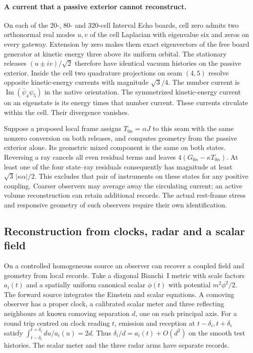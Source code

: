 \documentclass[11pt]{article}
\begin{document}
\paragraph{A current that a passive exterior cannot reconstruct.}
\label{par:ray-pair-native-current}
On each of the 20-, 80- and 320-cell Interval Echo boards, cell zero
admits two orthonormal real modes $u,v$ of the cell Laplacian with
eigenvalue six and zeros on every gateway. Extension by zero makes them
exact eigenvectors of the free board generator at kinetic energy three
above its uniform orbital. The stationary releases $(u\pm iv)/\sqrt2$
therefore have identical vacuum histories on the passive exterior.
Inside the cell two quadrature projections on seam $(4,5)$ resolve
opposite kinetic-energy currents with magnitude $\sqrt3/4$. The
number current is $\operatorname{Im}(\bar\psi_4\psi_5)$ in the native
orientation. The symmetrized kinetic-energy current on an eigenstate is
its energy times that number current. These currents circulate within
the cell. Their divergence vanishes.

Suppose a proposed local frame assigns $T_{0n}=\alpha J$ to this seam
with the same nonzero conversion on both releases, and computes geometry
from the passive exterior alone. Its geometric mixed component is the
same on both states. Reversing a ray cancels all even residual terms and
leaves $4(G_{0n}-\kappa T_{0n})$. At least one of the four state--ray
residuals consequently has magnitude at least
$\sqrt3\,|\kappa\alpha|/2$. This excludes that pair of instruments on
these states for any positive coupling. Coarser observers may average
away the circulating current; an active volume reconstruction can retain
additional records. The actual rest-frame stress and responsive geometry
of such observers require their own identification.

\subsection{Reconstruction from clocks, radar and a scalar field}

On a controlled homogeneous source an observer can recover a coupled
field and geometry from local records. Take a diagonal Bianchi~I metric
with scale factors $a_i(t)$ and a spatially uniform canonical scalar
$\phi(t)$ with potential $m^2\phi^2/2$. The forward source integrates
the Einstein and scalar equations. A comoving observer has a proper clock,
a calibrated scalar meter and three reflecting neighbours at known comoving
separation $d$, one on each principal axis. For a round trip centred on
clock reading $t$, emission and reception at $t-\delta_i,t+\delta_i$
satisfy $\int_{t-\delta_i}^{t+\delta_i}du/a_i(u)=2d$.
Thus $\delta_i/d=a_i(t)+O(d^2)$ on the smooth test histories. The
scalar meter and the three radar arms have separate records.
\end{document}
